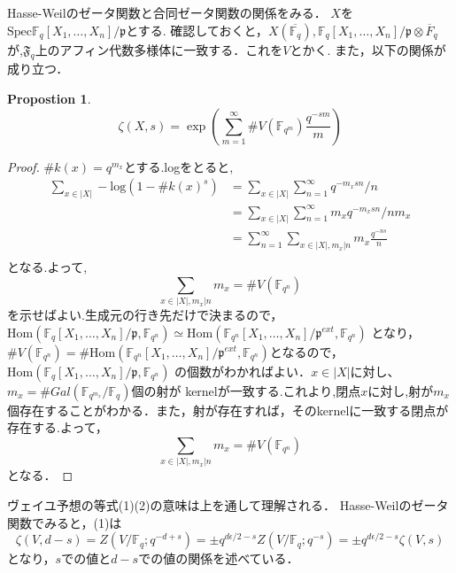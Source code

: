 \documentclass{ujarticle}
\newtheorem{prop}[thm]{Propostion}
\begin{document}
Hasse-Weilのゼータ関数と合同ゼータ関数の関係をみる．
$X$を$\mathrm{Spec}\mathbb{F}_q[X_1,\dots,X_n]/\mathfrak{p}$とする.
確認しておくと，$X(\overline{\mathbb{F}_q}),\mathbb{F}_q[X_1,\dots,X_n]/\mathfrak{p}\otimes \overline{F}_q$が,$\mathfrak{F}_q$上のアフィン代数多様体に一致する．これを$V$とかく.
また，以下の関係が成り立つ．
\begin{prop}
  \begin{equation*}
   \zeta(X,s)=\exp(\sum_{m=1}^{\infty}\#V(\mathbb{F}_{q^m}) \frac{q^{-sm}}{m})
  \end{equation*}
\end{prop}
\begin{proof}
  $\#k(x)=q^{m_x}$とする.logをとると,
  \begin{align*}
    \sum_{x \in |X|} -\mathrm{log}(1-\#k(x)^s) &=
    \sum_{x \in |X|}\sum_{n=1}^{\infty} q^{-m_xsn}/n \\
    & = \sum_{x \in |X|}\sum_{n=1}^{\infty} m_xq^{-m_xsn}/nm_x \\
    & = \sum_{n=1}^{\infty}\sum_{x\in |X|, m_x|n}m_x \frac{q^{-ns}}{n} \\
  \end{align*}
  となる.よって,
  \begin{equation*}
   \sum_{x\in |X|, m_x|n}m_x = \#V(\mathbb{F}_{q^n})
  \end{equation*}
  を示せばよい.生成元の行き先だけで決まるので，$\mathrm{Hom}(\mathbb{F}_q[X_1,\dots,X_n]/\mathfrak{p},\mathbb{F}_{q^n})
  \simeq \mathrm{Hom}(\mathbb{F}_{q^n}[X_1,\dots,X_n]/\mathfrak{p}^{ext},\mathbb{F}_{q^n})$
  となり， $\#V(\mathbb{F}_{q^n})=\#\mathrm{Hom}(\mathbb{F}_{q^n}[X_1,\dots,X_n]/\mathfrak{p}^{ext},\mathbb{F}_{q^n})$となるので，$\mathrm{Hom}(\mathbb{F}_q[X_1,\dots,X_n]/\mathfrak{p},\mathbb{F}_{q^n})$
  の個数がわかればよい．$x \in |X|$に対し、$m_x=\#Gal(\mathbb{F}_{q^{m_x}}/\mathbb{F}_q)$個の射が
  kernelが一致する.これより,閉点$x$に対し,射が$m_x$個存在することがわかる．また，射が存在すれば，そのkernelに一致する閉点が存在する.よって，
  \begin{equation*}
   \sum_{x\in |X|, m_x|n}m_x = \#V(\mathbb{F}_{q^n})
  \end{equation*}
  となる．
\end{proof}
ヴェイユ予想の等式(1)(2)の意味は上を通して理解される．
Hasse-Weilのゼータ関数でみると，(1)は
\begin{equation*}
 \zeta(V,d-s)=Z(V/\mathbb{F}_q;q^{-d+s})=\pm q^{d \epsilon/2 -s}Z(V/\mathbb{F}_q;q^{-s})
 = \pm q^{d \epsilon/2 -s} \zeta(V,s)
\end{equation*}
となり，$s$での値と$d-s$での値の関係を述べている．
\end{document}
